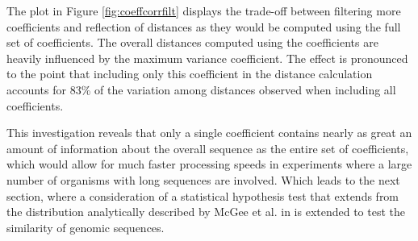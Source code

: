 The plot in Figure \ref{fig:coeffcorrfilt} displays the trade-off between filtering more coefficients 
and reflection of distances as they would be computed using the full set of coefficients.  The overall 
distances computed using the coefficients are heavily influenced by the maximum variance coefficient. 
The effect is pronounced to the point that including only this coefficient in the distance calculation 
accounts for 83\% of the variation among distances observed when including all coefficients. 

This investigation reveals that only a single coefficient contains nearly as great an amount of 
information about the overall sequence as the entire set of coefficients, which would allow for 
much faster processing speeds in experiments where a large number of organisms with long sequences are 
involved.  Which leads to the next section, where a consideration of a statistical hypothesis test 
that extends from the distribution analytically described by McGee et al. in \cite{mcg98} is extended 
to test the similarity of genomic sequences. 